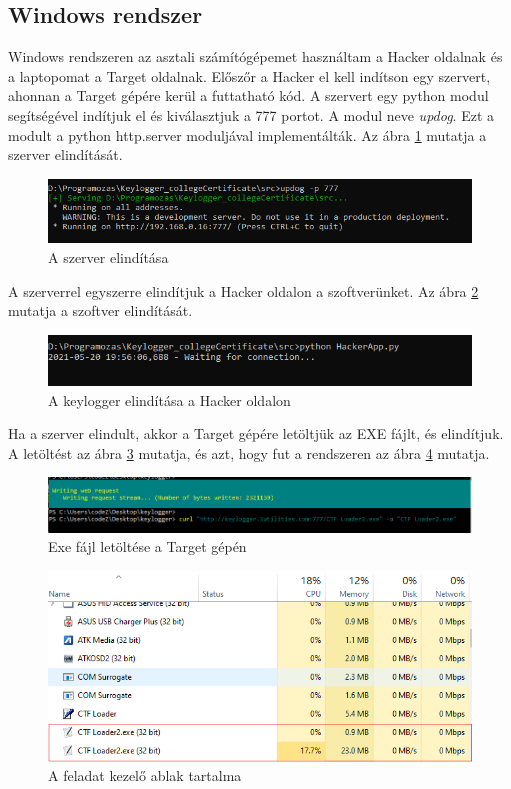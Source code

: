 \documentclass[12pt,a4paper,oneside]{report}
\begin{document}
\subsection{Windows rendszer}
Windows rendszeren az asztali számítógépemet használtam a Hacker oldalnak és a laptopomat a Target oldalnak. Előszőr a Hacker el kell indítson egy szervert, ahonnan a Target gépére kerül a futtatható kód. A szervert egy python modul segítségével indítjuk el és kiválasztjuk a 777 portot. A modul neve \textit{updog}. Ezt a modult a python http.server moduljával implementálták. Az ábra \ref{fig:winPC1} mutatja a szerver elindítását.
\begin{figure}[H]
\centering
\includegraphics[width=450pt]{../images/windowsPC1}
\caption{A szerver elindítása}
\label{fig:winPC1}
\end{figure}

A szerverrel egyszerre elindítjuk a Hacker oldalon a szoftverünket. Az ábra \ref{fig:winPC4} mutatja a szoftver elindítását.
\begin{figure}[H]
\centering
\includegraphics[width=450pt]{../images/windowsPC4}
\caption{A keylogger elindítása a Hacker oldalon}
\label{fig:winPC4}
\end{figure}

Ha a szerver elindult, akkor a Target gépére letöltjük az EXE fájlt, és elindítjuk. A letöltést az ábra \ref{fig:winPC2} mutatja, és azt, hogy fut a rendszeren az ábra \ref{fig:winPC3} mutatja.
\begin{figure}[H]
\centering
\includegraphics[width=450pt]{../images/windowsPC2}
\caption{Exe fájl letöltése a Target gépén}
\label{fig:winPC2}
\end{figure}
\begin{figure}[H]
\centering
\includegraphics[width=450pt]{../images/windowsPC3}
\caption{A feladat kezelő ablak tartalma}
\label{fig:winPC3}
\end{figure}
\end{document}
